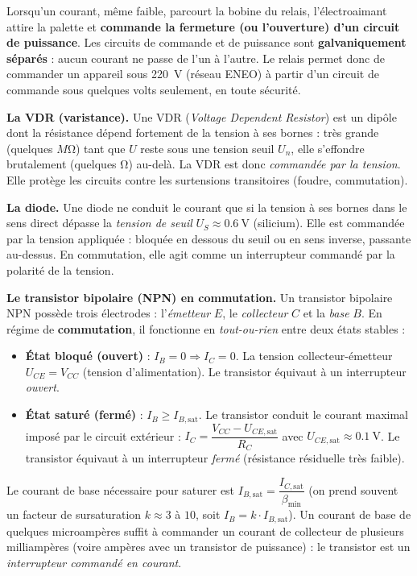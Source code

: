 \documentclass[11pt]{article}
\newcommand{\cle}[1]{{\popxbold\color{popdark}#1}}
\begin{document}
\begin{propriete}
Lorsqu'un courant, même faible, parcourt la bobine du relais, l'électroaimant attire la palette et \textbf{commande la fermeture (ou l'ouverture) d'un circuit de puissance}. Les circuits de commande et de puissance sont \textbf{galvaniquement séparés} : aucun courant ne passe de l'un à l'autre. Le relais permet donc de commander un appareil sous \SI{220}{\volt} (réseau ENEO) à partir d'un circuit de commande sous quelques volts seulement, en toute sécurité.
\end{propriete}

\textbf{La VDR (varistance).} Une \cle{VDR} (\emph{Voltage Dependent Resistor}) est un dipôle dont la résistance dépend fortement de la tension à ses bornes : très grande (quelques $\si{M\ohm}$) tant que $U$ reste sous une tension seuil $U_n$, elle s'effondre brutalement (quelques $\si{\ohm}$) au-delà. La VDR est donc \emph{commandée par la tension}. Elle protège les circuits contre les surtensions transitoires (foudre, commutation).

\textbf{La diode.} Une \cle{diode} ne conduit le courant que si la tension à ses bornes dans le sens direct dépasse la \emph{tension de seuil} $U_S \approx \SI{0,6}{\volt}$ (silicium). Elle est commandée par la tension appliquée : bloquée en dessous du seuil ou en sens inverse, passante au-dessus. En commutation, elle agit comme un interrupteur commandé par la polarité de la tension.

\textbf{Le transistor bipolaire (NPN) en commutation.} Un \cle{transistor} bipolaire NPN possède trois électrodes : l'\emph{émetteur} $E$, le \emph{collecteur} $C$ et la \emph{base} $B$. En régime de \textbf{commutation}, il fonctionne en \emph{tout-ou-rien} entre deux états stables :
\begin{itemize}
\item \textbf{État bloqué (ouvert)} : $I_B = 0 \Rightarrow I_C = 0$. La tension collecteur-émetteur $U_{CE} = V_{CC}$ (tension d'alimentation). Le transistor équivaut à un interrupteur \emph{ouvert}.
\item \textbf{État saturé (fermé)} : $I_B \ge I_{B,\text{sat}}$. Le transistor conduit le courant maximal imposé par le circuit extérieur : $I_C = \dfrac{V_{CC} - U_{CE,\text{sat}}}{R_C}$ avec $U_{CE,\text{sat}} \approx \SI{0,1}{\volt}$. Le transistor équivaut à un interrupteur \emph{fermé} (résistance résiduelle très faible).
\end{itemize}
Le courant de base nécessaire pour saturer est $I_{B,\text{sat}} = \dfrac{I_{C,\text{sat}}}{\beta_{\min}}$ (on prend souvent un facteur de sursaturation $k \approx 3$ à $10$, soit $I_B = k \cdot I_{B,\text{sat}}$). Un courant de base de quelques microampères suffit à commander un courant de collecteur de plusieurs milliampères (voire ampères avec un transistor de puissance) : le transistor est un \emph{interrupteur commandé en courant}.
\end{document}
